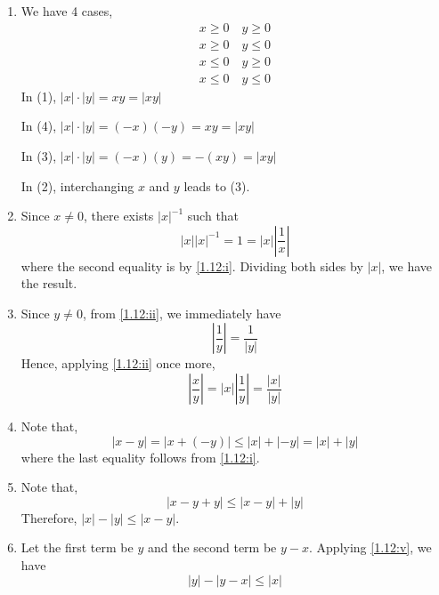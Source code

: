 \begin{solution}
  \begin{enumerate}[label=(\roman*)]
    \item We have 4 cases,
    \begin{align*}
      x\geq0 \quad y\geq0 \tag{1} \\
      x\geq0 \quad y\leq0 \tag{2} \\
      x\leq0 \quad y\geq0 \tag{3} \\
      x\leq0 \quad y\leq0 \tag{4}
    \end{align*}
    In (1), $|x|\cdot|y|=xy=|xy|$ \par
    In (4), $|x|\cdot|y|=(-x)(-y)=xy=|xy|$ \par
    In (3), $|x|\cdot|y|=(-x)(y)=-(xy)=|xy|$ \par
    In (2), interchanging $x$ and $y$ leads to (3).
    \item Since $x\neq0$, there exists $|x|^{-1}$ such that
    \begin{equation*}
      |x||x|^{-1}=1=|x|\left|\frac{1}{x}\right|
    \end{equation*}
    where the second equality is by \ref{1.12:i}. Dividing
    both sides by $|x|$, we have the result.
    \item Since $y\neq0$, from \ref{1.12:ii}, we immediately
    have
    \begin{equation*}
      \left|\frac{1}{y}\right|=\frac{1}{|y|}
    \end{equation*}
    Hence, applying \ref{1.12:ii} once more,
    \begin{equation*}
      \left|\frac{x}{y}\right|=|x|\left|\frac{1}{y}\right|
      =\frac{|x|}{|y|}
    \end{equation*}
    \item Note that,
    \begin{equation*}
      |x-y|=|x+(-y)|\leq|x|+|-y|=|x|+|y|
    \end{equation*}
    where the last equality follows from \ref{1.12:i}.
    \item Note that,
    \begin{equation*}
      |x-y+y|\leq|x-y|+|y|
    \end{equation*}
    Therefore, $|x|-|y|\leq|x-y|$.
    \item Let the first term be $y$ and the second term
    be $y-x$. Applying \ref{1.12:v}, we have
    \begin{equation*}
      |y|-|y-x|\leq|x|
    \end{equation*}

\end{enumerate}
\end{solution}

